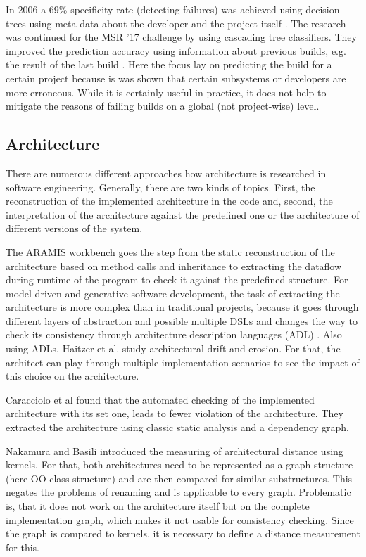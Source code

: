 \documentclass[conference]{IEEEtran}
\begin{document}
In 2006 a 69\% specificity rate (detecting failures) was achieved using decision trees using meta data about the developer and the project itself \cite{Pred-Tree}.
The research was continued for the MSR '17 challenge by using cascading tree classifiers. They improved the prediction accuracy using information about previous builds, e.g. the result of the last build \cite{Pred-Cascade}. 
Here the focus lay on predicting the build for a certain project because is was shown that certain subsystems or developers are more erroneous. While it is certainly useful in practice, it does not help to mitigate the reasons of failing builds on a global (not project-wise) level.

\subsection{Architecture}


There are numerous different approaches how architecture is researched in software engineering. Generally, there are two kinds of topics. First, the reconstruction of the implemented architecture in the code and, second, the interpretation of the architecture against the predefined one or the architecture of different versions of the system.

The ARAMIS workbench \cite{Aramis} goes the step from the static reconstruction of the architecture based on method calls and inheritance to extracting the dataflow during runtime of the program to check it against the predefined structure. 
For model-driven and generative software development, the task of extracting the architecture is more complex than in traditional projects, because it goes through different layers of abstraction and possible multiple DSLs and changes the way to check its consistency through architecture description languages (ADL) \cite{ArcCons,Arc-MDSE}. Also using ADLs, Haitzer et al. \cite{Arc-Decision} study architectural drift and erosion. For that, the architect can play through multiple implementation scenarios to see the impact of this choice on the architecture.

Caracciolo et al \cite{ArcConf} found that the automated checking of the implemented architecture with its set one, leads to fewer violation of the architecture. They extracted the architecture using classic static analysis and a dependency graph.  

Nakamura and Basili \cite{StructDist} introduced the measuring of architectural distance using kernels. For that, both architectures need to be represented as a graph structure (here OO class structure) and are then compared for similar substructures. This negates the problems of renaming and is applicable to every graph. Problematic is, that it does not work on the architecture itself but on the complete implementation graph, which makes it not usable for consistency checking. Since the graph is compared to kernels, it is necessary to define a distance measurement for this.
\end{document}
